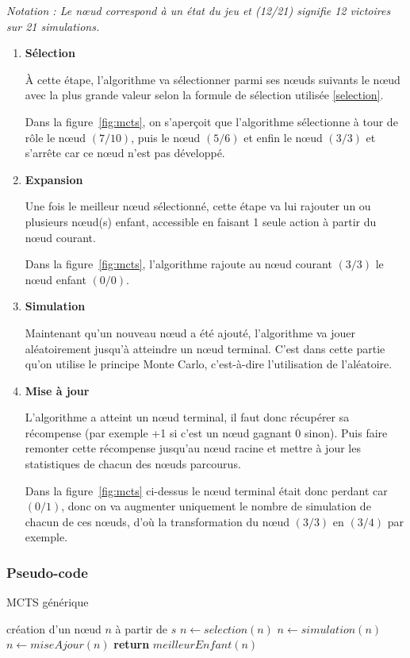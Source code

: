 \documentclass[pdftex,french, english]{article}	%
\begin{document}
\textit{Notation : Le nœud correspond à un état du jeu et (12/21) signifie 12 victoires sur 21 simulations.} 
	\begin{enumerate}
		\item \textbf{Sélection}

		À cette étape, l'algorithme va sélectionner parmi ses nœuds suivants le nœud avec la plus grande valeur selon la formule de sélection utilisée \ref{selection}. 

		Dans la figure~\ref{fig:mcts}, on s'aperçoit que l'algorithme sélectionne à tour de rôle le nœud $(7/10)$, puis le nœud $(5/6)$ et enfin le nœud $(3/3)$ et s'arrête car ce nœud n'est pas développé.
		\item \textbf{Expansion}

		Une fois le meilleur nœud sélectionné, cette étape va lui rajouter un ou plusieurs nœud(s) enfant, accessible en faisant 1 seule action à partir du nœud courant. 

		Dans la figure~\ref{fig:mcts}, l'algorithme rajoute au nœud courant $(3/3)$ le nœud enfant $(0/0)$.
		\item \textbf{Simulation}

		Maintenant qu'un nouveau nœud a été ajouté, l'algorithme va jouer aléatoirement jusqu'à atteindre un nœud terminal.
		C'est dans cette partie qu'on utilise le principe Monte Carlo, c'est-à-dire l'utilisation de l'aléatoire.
		\item \textbf{Mise à jour} 

		L'algorithme a atteint un nœud terminal, il faut donc récupérer sa récompense (par exemple +1 si c'est un nœud gagnant 0 sinon). Puis faire remonter cette récompense jusqu'au nœud racine et mettre à jour les statistiques de chacun des nœuds parcourus. 

		Dans la figure~\ref{fig:mcts} ci-dessus le nœud terminal était donc perdant car $(0/1)$, donc on va augmenter uniquement le nombre de simulation de chacun de ces nœuds, d'où la transformation du nœud $(3/3)$ en $(3/4)$ par exemple.
	\end{enumerate}
	\subsubsection{Pseudo-code}
	\begin{algorithm}
	\caption{MCTS générique}
	  \label{alg:mcts}
	\begin{algorithmic}[1]
	\State création d'un nœud $n$ à partir de $s$
			\State $n \gets selection(n)$ 
			\State $n \gets simulation(n)$
			\State $n \gets miseAjour(n)$
		\EndWhile
	\State \textbf{return} $meilleurEnfant(n)$
	\EndFunction
	\end{algorithmic}
	\end{algorithm}
    
\end{document}
